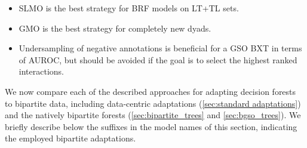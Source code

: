 \begin{mdframed}[frametitle={Key findings}]
    \begin{itemize}
        \item SLMO is the best strategy for BRF models on LT+TL sets.
        \item GMO is the best strategy for completely new dyads.
        \item Undersampling of negative annotations is beneficial for a GSO BXT in terms of AUROC, but should be avoided if the goal is to select the highest ranked interactions.
    \end{itemize}
\end{mdframed}

We now compare each of the described approaches for adapting decision forests to bipartite data, including data-centric adaptations (\autoref{sec:standard adaptations}) and the natively bipartite forests (\autoref{sec:bipartite_trees} and \autoref{sec:bgso_trees}). We briefly describe below the suffixes in the model names of this section, indicating the employed bipartite adaptations.


